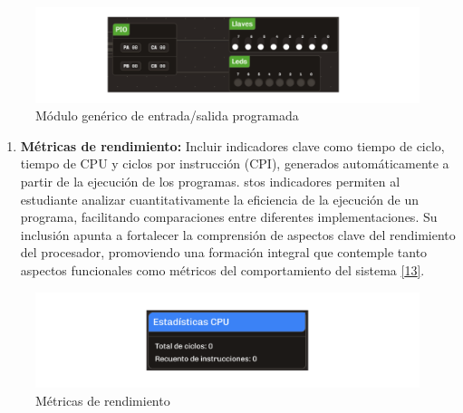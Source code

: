 \documentclass[12pt,oneside]{templates/unerthesis}
\providecommand{\tightlist}{%
  \setlength{\itemsep}{0pt}\setlength{\parskip}{0pt}}
\begin{document}
\begin{figure}

{\centering \includegraphics[width=0.85\linewidth]{images/perifericos} 

}

\caption{Módulo genérico de entrada/salida programada}\label{fig:perifericos}
\end{figure}

\begin{enumerate}
\def\labelenumi{\arabic{enumi}.}
\setcounter{enumi}{5}
\tightlist
\item
  \textbf{Métricas de rendimiento:}
  Incluir indicadores clave como tiempo de ciclo, tiempo de CPU y ciclos por instrucción (CPI), generados automáticamente a partir de la ejecución de los programas. stos indicadores permiten al estudiante analizar cuantitativamente la eficiencia de la ejecución de un programa, facilitando comparaciones entre diferentes implementaciones. Su inclusión apunta a fortalecer la comprensión de aspectos clave del rendimiento del procesador, promoviendo una formación integral que contemple tanto aspectos funcionales como métricos del comportamiento del sistema \protect\hyperlink{ref-hennessy2017computer}{{[}13{]}}.
\end{enumerate}

\begin{figure}

{\centering \includegraphics[width=0.85\linewidth]{images/metricas} 

}

\caption{Métricas de rendimiento}\label{fig:metricas}
\end{figure}
\end{document}

